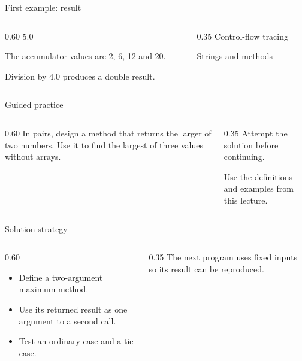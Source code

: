 \documentclass[10pt,aspectratio=169]{beamer}
\begin{document}
\begin{frame}[fragile,t]{First example: result}
\begin{columns}[T,onlytextwidth]\begin{column}{0.60\textwidth}
5.0\par The accumulator values are 2, 6, 12 and 20.\par Division by 4.0 produces a double result.
\end{column}\begin{column}{0.35\textwidth}\small
Control-flow tracing

Strings and methods
\end{column}\end{columns}
\end{frame}

\begin{frame}[fragile,t]{Guided practice}
\begin{columns}[T,onlytextwidth]\begin{column}{0.60\textwidth}
In pairs, design a method that returns the larger of two numbers. Use it to find the largest of three values without arrays.
\end{column}\begin{column}{0.35\textwidth}\small
Attempt the solution before continuing.

Use the definitions and examples from this lecture.
\end{column}\end{columns}
\end{frame}

\begin{frame}[fragile,t]{Solution strategy}
\begin{columns}[T,onlytextwidth]\begin{column}{0.60\textwidth}
\begin{itemize}
\item Define a two-argument maximum method.
\item Use its returned result as one argument to a second call.
\item Test an ordinary case and a tie case.
\end{itemize}
\end{column}\begin{column}{0.35\textwidth}\small
The next program uses fixed inputs so its result can be reproduced.
\end{column}\end{columns}
\end{frame}
\end{document}
